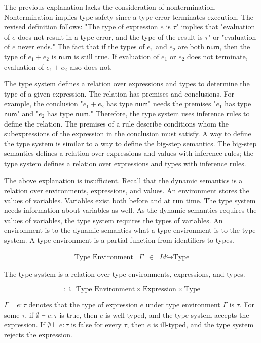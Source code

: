 The previous explanation lacks the consideration of nontermination.
Nontermination implies type safety since a type error terminates execution. The
revised definition follows: "The type of expression $e$ is $\tau$" implies that
"evaluation of $e$ does not result in a type error, and the type of the result is
$\tau$" or "evaluation of $e$ never ends." The fact that if the types of $e_1$
and $e_2$ are both $\textsf{num}$, then the type of $e_1+e_2$ is $\textsf{num}$
is still true. If evaluation of $e_1$ or $e_2$ does not terminate, evaluation of
$e_1+e_2$ also does not.

The type system defines a relation over expressions and types to determine the
type of a given expression. The relation has premises and conclusions. For
example, the conclusion "$e_1+e_2$ has type $\textsf{num}$" needs the premises
"$e_1$ has type $\textsf{num}$" and "$e_2$ has type $\textsf{num}$." Therefore,
the type system uses inference rules to define the relation. The premises of a
rule describe conditions whom the subexpressions of the expression in the
conclusion must satisfy. A way to define the type system is similar to a way to
define the big-step semantics. The big-step semantics defines a relation over
expressions and values with inference rules; the type system defines a relation
over expressions and types with inference rules.

The above explanation is insufficient. Recall that the dynamic semantics is a
relation over environments, expressions, and values. An environment stores the
values of variables. Variables exist both before and at run time. The type system
needs information about variables as well. As the dynamic semantics requires the
values of variables, the type system requires the types of variables. An
environment is to the dynamic semantics what a type environment is to the type
system. A type environment is a partial function from identifiers to types.

\[
\begin{array}{lrcl}
\text{Type Environment} & \Gamma & \in & \textit{Id}\hookrightarrow\text{Type}
\end{array}
\]

The type system is a relation over type environments, expressions, and types.

\[:\subseteq\text{Type Environment}\times\text{Expression}\times\text{Type}\]

$\Gamma\vdash e:\tau$ denotes that the type of expression $e$ under type
environment $\Gamma$ is $\tau$. For some $\tau$, if $\emptyset\vdash e:\tau$ is
true, then $e$ is well-typed, and the type system accepts the expression. If
$\emptyset\vdash e:\tau$ is false for every $\tau$, then $e$ is ill-typed, and
the type system rejects the expression.

